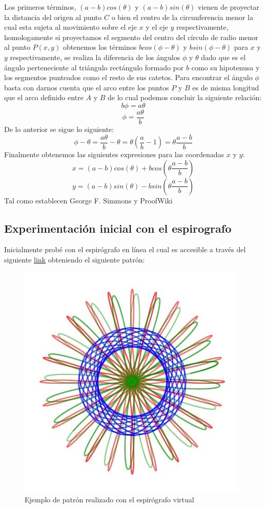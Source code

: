 \documentclass[letterpaper,11pt,dvipsnames]{article}
\begin{document}
Los primeros términos, $(a-b)cos(\theta)$ y $(a-b)sin(\theta)$ vienen de proyectar la distancia del origen al punto $C$ o bien el centro de la circunferencia menor la cual esta sujeta al movimiento sobre el eje $x$ y el eje $y$ respectivamente, homologamente si proyectamos el segmento del centro del círculo de radio menor al punto $P(x,y)$ obtenemos los términos $bcos(\phi - \theta)$ y $bsin(\phi-\theta)$ para $x$ y $y$ respectivamente, se realiza la diferencia de los ángulos $\phi$ y $\theta$ dado que es el ángulo perteneciente al triángulo rectángulo formado por $b$ como su hipotenusa y los segmentos punteados como el resto de sus catetos.
Para encontrar el ángulo $\phi$ basta con darnos cuenta que el arco entre los puntos $P$ y $B$ es de misma longitud que el arco definido entre $A$ y $B$ de lo cual podemos concluir la siguiente relación:
\[
b\phi=a\theta
\]
\[
\phi=\frac{a\theta}{b}
\]
De lo anterior se sigue lo siguiente:
\[
\phi-\theta=\frac{a\theta}{b} - \theta = \theta (\frac{a}{b} - 1) = \theta \frac{a-b}{b}
\]
Finalmente obtenemos las siguientes expresiones para las coordenadas $x$ y $y$:
\[
x=(a-b)cos(\theta)+bcos(\theta \frac{a-b}{b})
\]
\[
y=(a-b)sin(\theta)-bsin(\theta \frac{a-b}{b})
\]
Tal como establecen George F. Simmons y ProofWiki
\subsection{Experimentación inicial con el espirografo}
Inicialmente probé con el espirógrafo en línea el cual es accesible a través del siguiente  \href{https://nathanfriend.io/inspiral-web/}{link} obteniendo el siguiente patrón:
\begin{figure}[h]
    \centering
    \includegraphics[scale=0.485]{espiro1 (1).jpg}
    \caption{Ejemplo de patrón realizado con el espirógrafo virtual}
    \label{fig:sample}
\end{figure}
\end{document}

